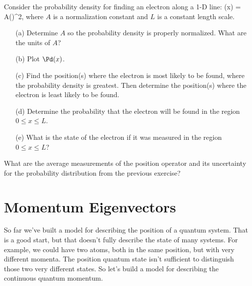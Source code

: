 \begin{exercise}

Consider the probability density for finding an electron along a 1-D line:
%
\beq
\Pd(x) = A\left(\right)^{2},
\eeq
%
where $A$ is a normalization constant and $L$ is a constant length scale.
\begin{enumerate}
\item[(a)]  Determine $A$ so the probability density is properly normalized.  What are the units of $A$?
\item[(b)]  Plot $\Pd(x)$.
\item[(c)]  Find the position(s) where the electron is most likely to be found, \ie where the probability density is greatest.  Then determine the position(s) where the electron is least likely to be found.
\item[(d)]  Determine the probability that the electron will be found in the region $0 \leq x \leq L$.
\item[(e)] What is the state of the electron if it was measured in the region $0 \leq x\leq L$? 
\end{enumerate}

\end{exercise}

\begin{exercise}
What are the average measurements of the position operator and its uncertainty for the probability distribution from the previous exercise?
\end{exercise}

\chapter{Momentum Eigenvectors}

So far we've built a model for describing the position of a quantum system. That is a good start, but that doesn't fully describe the state of many systems. For example, we could have two atoms, both in the same position, but with very different momenta. The position quantum state isn't sufficient to distinguish those two very different states. So let's build a model for describing the continuous quantum momentum.
\begin{marginfigure}[-2cm]
\end{marginfigure}

